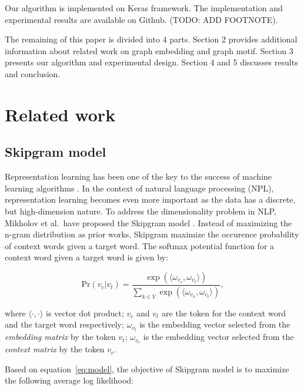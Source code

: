 \documentclass[letterpaper]{article}
\begin{document}
        Our algorithm is implemented on Keras \cite{keras} framework. The implementation and experimental
        results are available on Github. (TODO: ADD FOOTNOTE).

        The remaining of this paper is divided into 4 parts. Section 2 provides additional information
        about related work on graph embedding and graph motif. Section 3 presents our algorithm and
        experimental design. Section 4 and 5 discusses results and conclusion.

    \section{Related work}
        \subsection{Skipgram model}
            Representation learning has been one of the key to the success of machine learning 
            algorithms \cite{bengiorepreview}. In the context of natural language processing (NPL),
            representation learning becomes even more important as the data has a discrete, but
            high-dimension nature. To address the dimensionality problem in NLP, Mikholov et al.\ have
            proposed the Skipgram model \cite{skipgram}. Instead of maximizing the n-gram distribution
            as prior works, Skipgram maximize the occurence probability of context words given a
            target word. The softmax potential function for a context word given a target 
            word is given by:

            \begin{equation}
                \label{eq:model}
                \mbox{Pr} (v_c | v_t) = \frac{\exp{( \langle \omega_{v_c} ,  \omega_{v_t} \rangle )}}{\sum_{k \in V} \exp{( \langle \omega_{v_k} ,  \omega_{v_t} \rangle )}},
            \end{equation}
            
            \noindent
            where $ \langle \cdot ,  \cdot \rangle $ is vector dot product; $ v_c $ and $ v_t $ are the
            token for the context word and the target word respectively; $\omega_{v_t}$ is the embedding
            vector selected from the \emph{embedding matrix} by the token $v_t$; $\omega_{v_c}$ is the
            embedding vector selected from the \emph{context matrix} by the token $v_c$.

            Based on equation~\ref{eq:model}, the objective of Skipgram model is to maximize the following
            average log likelihood:
\end{document}
